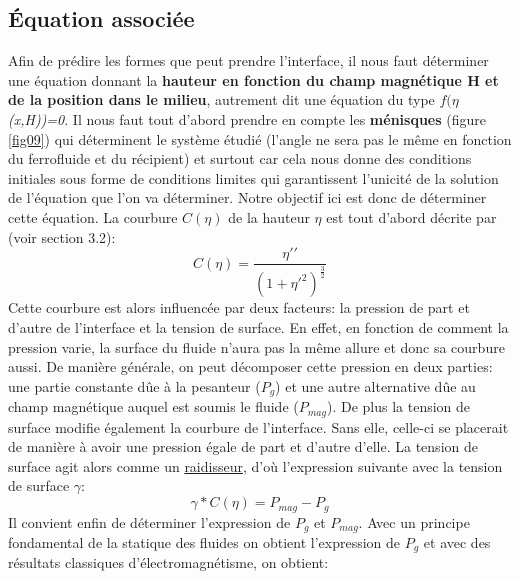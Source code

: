 \documentclass[10pt,a4paper]{article}
\begin{document}
\subsection{Équation associée}
Afin de prédire les formes que peut prendre l'interface, il nous faut déterminer une équation donnant la \textbf{hauteur en fonction du champ magnétique H et de la position dans le milieu}, autrement dit une équation du type \textit{$f(\eta$(x,H))=0}. 
\newline
\newline
Il nous faut tout d'abord prendre en compte les \textbf{ménisques} (figure \ref{fig09}) qui déterminent le système étudié (l'angle ne sera pas le même en fonction du ferrofluide et du récipient) et surtout car cela nous donne des conditions initiales sous forme de conditions limites qui garantissent l'unicité de la solution de l'équation que l'on va déterminer. 
\newline
\newline
Notre objectif ici est donc de déterminer cette équation.
\newline
\newline
La courbure $C(\eta)$ de la hauteur $\eta$ est tout d'abord décrite par (voir section 3.2):
\begin{equation}
C(\eta)=\frac{\eta\prime\prime}{(1+\eta\prime^2)^{\frac{3}{2}}}
\end{equation}
Cette courbure est alors influencée par deux facteurs: la pression de part et d'autre de l'interface et la tension de surface. En effet, en fonction de comment la pression varie, la surface du fluide n'aura pas la même allure et donc sa courbure aussi. De manière générale, on peut décomposer cette pression en deux parties: une partie constante dûe à la pesanteur ($P_g$) et une autre alternative dûe au champ magnétique auquel est soumis le fluide ($P_{mag}$).
\newline
\newline
De plus la tension de surface modifie également la courbure de l'interface. Sans elle, celle-ci se placerait de manière à avoir une pression égale de part et d'autre d'elle. La tension de surface agit alors comme un \underline{raidisseur}, d'où l'expression suivante avec la tension de surface $\gamma$:
\begin{equation}
\gamma*C(\eta)= P_{mag} - P_{g}
\end{equation}
Il convient enfin de déterminer l'expression de $P_{g}$ et $P_{mag}$.
Avec un principe fondamental de la statique des fluides on obtient l'expression de $P_{g}$ et avec des résultats classiques d'électromagnétisme, on obtient:
\end{document}
